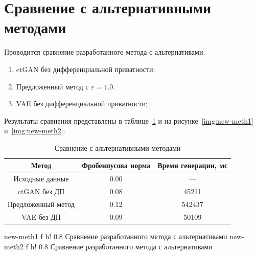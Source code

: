 



\section{Сравнение с альтернативными методами}

Проводится сравнение разработанного метода с альтернативами:
\begin{enumerate}
	\item ctGAN без дифференциальной приватности;
	\item Предложенный метод с $\varepsilon = 1.0$.
	\item VAE без дифференциальной приватности;
\end{enumerate}
\newpage
Результаты сравнения представлены в таблице~\ref{tab:baseline_comparison} и на рисунке~\ref{img:new-meth1} и~\ref{img:new-meth2}:

\begin{table}[h!]
	\centering
	\captionsetup{justification=raggedleft}
	\caption{Сравнение с альтернативными методами}
	\label{tab:baseline_comparison}
	\begin{tabular}{|c|c|c|}
		\hline
		Метод & Фробениусова норма & Время генерации, мс \\
		\hline
		Исходные данные & 0.00 & --- \\
		\hline
		ctGAN без ДП & 0.08 & 45211 \\
		\hline
		Предложенный метод & 0.12 & 542437 \\
		\hline
		VAE без ДП & 0.09 & 50109 \\
		\hline

	\end{tabular}
\end{table}

{new-meth1} %
{f} %
{h!} %
{0.8\textwidth} %
{Сравнение разработанного метода с альтернативами} %
{new-meth2} %
{f} %
{h!} %
{0.8\textwidth} %
{Сравнение разработанного метода с альтернативами} %


